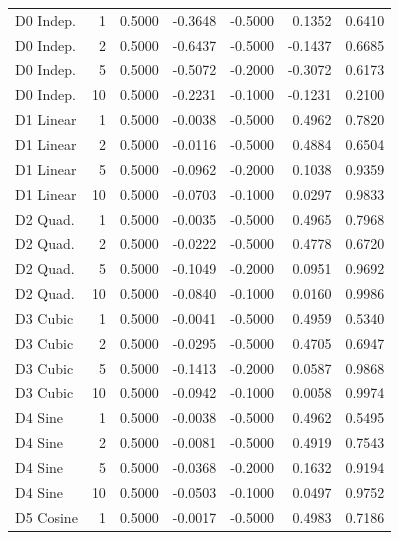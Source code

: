 \begin{tabular}{lrrrrrr}
   D0 Indep. &    1 & 0.5000 &    -0.3648 &       -0.5000 &      0.1352 & 0.6410 \\
   D0 Indep. &    2 & 0.5000 &    -0.6437 &       -0.5000 &     -0.1437 & 0.6685 \\
   D0 Indep. &    5 & 0.5000 &    -0.5072 &       -0.2000 &     -0.3072 & 0.6173 \\
   D0 Indep. &   10 & 0.5000 &    -0.2231 &       -0.1000 &     -0.1231 & 0.2100 \\
   D1 Linear &    1 & 0.5000 &    -0.0038 &       -0.5000 &      0.4962 & 0.7820 \\
   D1 Linear &    2 & 0.5000 &    -0.0116 &       -0.5000 &      0.4884 & 0.6504 \\
   D1 Linear &    5 & 0.5000 &    -0.0962 &       -0.2000 &      0.1038 & 0.9359 \\
   D1 Linear &   10 & 0.5000 &    -0.0703 &       -0.1000 &      0.0297 & 0.9833 \\
    D2 Quad. &    1 & 0.5000 &    -0.0035 &       -0.5000 &      0.4965 & 0.7968 \\
    D2 Quad. &    2 & 0.5000 &    -0.0222 &       -0.5000 &      0.4778 & 0.6720 \\
    D2 Quad. &    5 & 0.5000 &    -0.1049 &       -0.2000 &      0.0951 & 0.9692 \\
    D2 Quad. &   10 & 0.5000 &    -0.0840 &       -0.1000 &      0.0160 & 0.9986 \\
    D3 Cubic &    1 & 0.5000 &    -0.0041 &       -0.5000 &      0.4959 & 0.5340 \\
    D3 Cubic &    2 & 0.5000 &    -0.0295 &       -0.5000 &      0.4705 & 0.6947 \\
    D3 Cubic &    5 & 0.5000 &    -0.1413 &       -0.2000 &      0.0587 & 0.9868 \\
    D3 Cubic &   10 & 0.5000 &    -0.0942 &       -0.1000 &      0.0058 & 0.9974 \\
     D4 Sine &    1 & 0.5000 &    -0.0038 &       -0.5000 &      0.4962 & 0.5495 \\
     D4 Sine &    2 & 0.5000 &    -0.0081 &       -0.5000 &      0.4919 & 0.7543 \\
     D4 Sine &    5 & 0.5000 &    -0.0368 &       -0.2000 &      0.1632 & 0.9194 \\
     D4 Sine &   10 & 0.5000 &    -0.0503 &       -0.1000 &      0.0497 & 0.9752 \\
   D5 Cosine &    1 & 0.5000 &    -0.0017 &       -0.5000 &      0.4983 & 0.7186 \\

\end{tabular}
